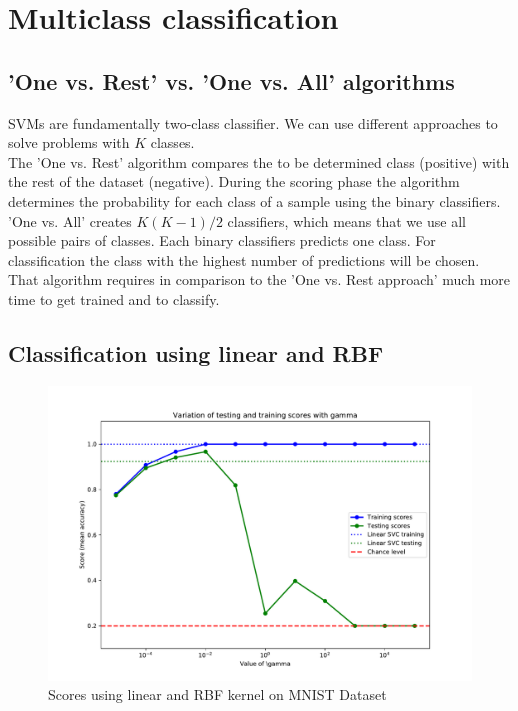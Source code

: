 \documentclass{article}
\begin{document}
\subsection{}

\subsection{}

\subsection{}


\section{Multiclass classification}

\subsection{'One vs. Rest' vs. 'One vs. All' algorithms}

SVMs are fundamentally two-class classifier. We can use different approaches to solve problems with $K$ classes. \\
The 'One vs. Rest' algorithm compares the to be determined class (positive) with the rest of the dataset (negative). During the scoring phase the algorithm determines the probability for each class of a sample using the binary classifiers.\\
'One vs. All' creates $K(K-1)/2$ classifiers, which means that we use all possible pairs of classes. Each binary classifiers predicts one class. For classification the class with the highest number of predictions will be chosen. That algorithm requires in comparison to the 'One vs. Rest approach' much more time to get trained and to classify.

\newpage

\subsection{Classification using linear and RBF}

\begin{figure}[!ht]
	\centering
	\includegraphics[width=.8\textwidth]{./Figures/3a_score.pdf}
	\caption{Scores using linear and RBF kernel on MNIST Dataset}
	\label{multiclass_classification}
\end{figure}
\end{document}
